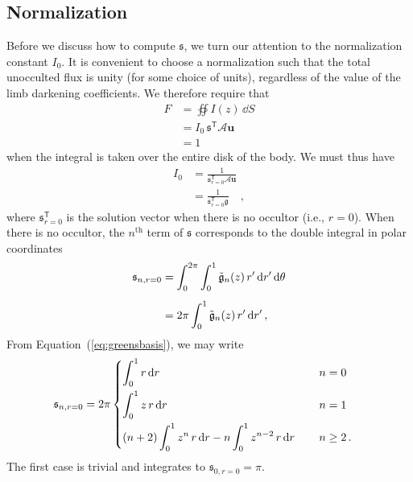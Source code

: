 \documentclass[modern,trackchanges]{aastex63}
\begin{document}
\subsection{Normalization}
\label{sec:normalization}
%
Before we discuss how to compute $\mathfrak{s}$, we turn our attention to
the normalization constant $I_0$. It is convenient to
choose a normalization such that the total unocculted flux is unity (for some choice of units), 
regardless of the value of the limb darkening coefficients. We therefore require that
%
\begin{align}
    \label{eq:normalization1}
    F &= \oiint I(z) \, \dd S \nonumber \\
      &= I_0 \, \mathfrak{s}^\mathsf{T} \mathcal{A} \mathbf{u} \nonumber \\
      &= 1
\end{align}
%
when the integral is taken over the entire disk of the body. We must thus have
%
\begin{align}
    \label{eq:normalization2}
    I_0 &= \frac{1}{\mathfrak{s}^\mathsf{T}_{r=0} \mathcal{A} \mathbf{u}} \nonumber \\[0.5em]
        &= \frac{1}{\mathfrak{s}^\mathsf{T}_{r=0} \mathfrak{g}} \quad,
\end{align}
%
where $\mathfrak{s}^\mathsf{T}_{r=0}$ is the solution vector when there is no
occultor (i.e., $r = 0$). When there is no occultor, the $n^\mathrm{th}$ term of $\mathfrak{s}$
corresponds to the double integral in polar coordinates
%
\begin{align}
    \label{eq:normalization3}
    \mathfrak{s}_{n,r=0} &= \int_0^{2\pi}\int_0^1 \gbasisn(z) \, r^\prime \, \dd r^\prime \, \dd\theta \nonumber \\[0.5em]
                         &= 2\pi \int_0^1 \gbasisn(z) \, r^\prime \, \dd r^\prime \quad,
\end{align}
%
From Equation~(\ref{eq:greensbasis}), we may write
%
\begin{align}
    \label{eq:normalization4}
    \mathfrak{s}_{n,r=0} &=
    2\pi
    \begin{dcases}
        \int_0^1 r \, \dd r & \qquad n = 0
        \\
        \int_0^1 z \, r \, \dd r & \qquad n = 1
        \\
        (n+2) \int_0^1 z^n \, r \, \dd r
        - n \int_0^1 z^{n-2} \, r \, \dd r
        & \qquad n \ge 2 \quad.
    \end{dcases}
\end{align}
%
The first case is trivial and integrates to $\mathfrak{s}_{0,r = 0} = \pi$.
\end{document}
